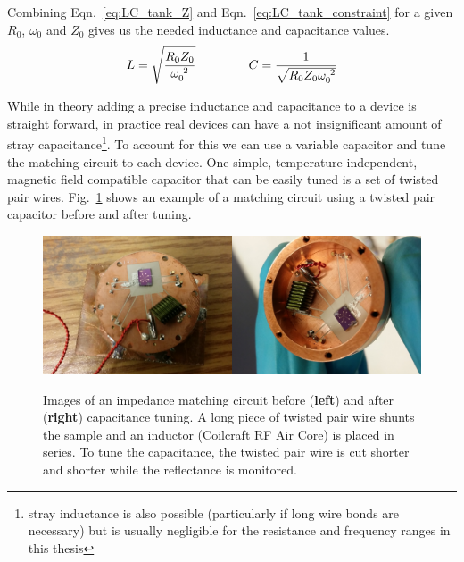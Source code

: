 Combining Eqn.~\ref{eq:LC_tank_Z} and Eqn.~\ref{eq:LC_tank_constraint} for a given $R_0$, $\omega_0$ and $Z_0$ gives us the needed inductance and capacitance values.
\begin{equation}\label{eq:LC_tank_LC}
L = \sqrt{\frac{R_0Z_0}{\omega_0^{~2}}}
\hspace{15mm}
C = \frac{1}{\sqrt{R_0Z_0\omega_0^{~2}}}
\end{equation}

While in theory adding a precise inductance and capacitance to a device is straight forward, in practice real devices can have a not insignificant amount of stray capacitance\footnote{stray inductance is also possible (particularly if long wire bonds are necessary) but is usually negligible for the resistance and frequency ranges in this thesis}. To account for this we can use a variable capacitor and tune the matching circuit to each device. One simple, temperature independent, magnetic field compatible capacitor that can be easily tuned is a set of twisted pair wires. Fig.~\ref{fig:picture_gimmicks} shows an example of a matching circuit using a twisted pair capacitor before and after tuning.
\begin{figure}
\centering
\includegraphics[width=0.5\textwidth]{figures/Johnson_noise_thermometry/picture_gimmick1.jpg}\includegraphics[width=0.5\textwidth]{figures/Johnson_noise_thermometry/picture_gimmick2.jpg}
\caption{Images of an impedance matching circuit before (\textbf{left}) and after (\textbf{right}) capacitance tuning. A long piece of twisted pair wire shunts the sample and an inductor (Coilcraft RF Air Core) is placed in series. To tune the capacitance, the twisted pair wire is cut shorter and shorter while the reflectance is monitored.}
\label{fig:picture_gimmicks}
\end{figure} 

